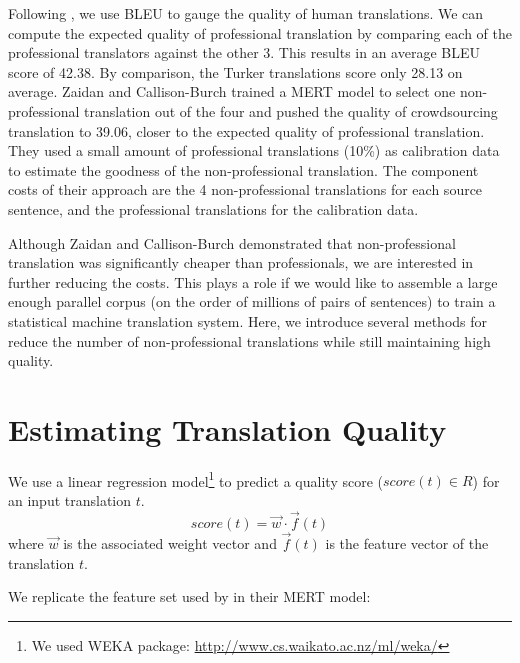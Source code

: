 \documentclass[11pt,letterpaper]{article}
\begin{document}
Following , we use BLEU \cite{papineni2002bleu} to gauge the quality of human translations.  We can compute the expected quality of professional translation by comparing each of the professional translators against the other 3.  This results in an average BLEU score of  42.38.  By comparison, the Turker translations score only 28.13 on average. Zaidan and Callison-Burch trained a MERT model to select one non-professional translation out of the four and pushed the quality of crowdsourcing translation to 39.06, closer to the expected quality of professional translation. They used a small amount of professional translations (10\%) as calibration data to estimate the goodness of the non-professional translation. The component costs of their approach are the 4 non-professional translations for each source sentence, and the professional translations for the calibration data.

Although Zaidan and Callison-Burch demonstrated that non-professional translation was significantly cheaper than professionals, we are interested in further reducing the costs.  This plays a role if we would like to assemble a large enough parallel corpus (on the order of millions of pairs of sentences) to train a statistical machine translation system. 
Here, we introduce several methods for reduce the number of non-professional translations  while still maintaining high quality. 



\section{Estimating Translation Quality}

We use a linear regression model\footnote{We used WEKA package: \url{http://www.cs.waikato.ac.nz/ml/weka/}} to predict a quality score ($ score(t) \in R$) for an input translation $t$.
\[ score(t) = \vec{w}  \cdot \vec f(t) \]
  where $\vec{w}$ is the associated weight vector and $\vec f(t)$ is the feature vector of the translation $t$. 

We replicate the feature set used by  in their MERT model:
\end{document}
